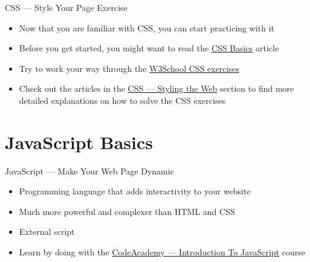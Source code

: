 \documentclass[aspectratio=169]{beamer}
\begin{document}
\begin{darkframes}
    \begin{frame}{CSS — Style Your Page Exercise}
        \begin{itemize}
            \item Now that you are familiar with CSS, you can start practicing with it
            \item Before you get started, you might want to read the \href{https://developer.mozilla.org/en-US/docs/Learn/Getting_started_with_the_web/CSS_basics}{CSS Basics} article
            \item Try to work your way through the \href{https://www.w3schools.com/css/exercise.asp}{W3School CSS exercises}
            \item Check out the articles in the \href{https://developer.mozilla.org/en-US/docs/Learn/CSS}{CSS — Styling the Web} section to find more detailed explanations on how to solve the CSS exercises
        \end{itemize}
    \end{frame}
    
    \section{JavaScript Basics}
    
    
     \begin{frame}{JavaScript — Make Your Web Page Dynamic}
        \begin{itemize}
            \item Programming language that adds interactivity to your website
            \item Much more powerful and complexer than HTML and CSS
            \item External script
            \jsExternalScript
            \item Learn by doing with the \href{https://www.codecademy.com/learn/introduction-to-javascript}{CodeAcademy — Introduction To JavaScript} course
        \end{itemize}
        
    \end{frame}
    

\end{darkframes}
\end{document}
